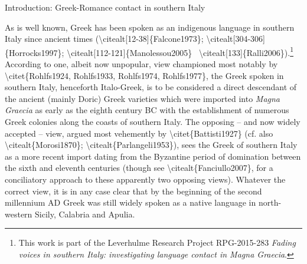 \documentclass[output=paper,modfonts,nonflat]{langsci/langscibook}
\begin{document}
\setcounter{listWWNumxileveli}{0}
\begin{listWWNumxileveli}
\item 
\begin{stylelsSectioni}
Introduction: Greek-Romance contact in southern Italy
\end{stylelsSectioni}
\end{listWWNumxileveli}
\begin{styleStandard}
As is well known, Greek has been spoken as an indigenous language in southern Italy since ancient times ({\textbackslash}citealt[12-38]\{Falcone1973\}; {\textbackslash}citealt[304-306]\{Horrocks1997\}; {\textbackslash}citealt[112-121]\{Manolessou2005\} \ {\textbackslash}citealt[133]\{Ralli2006\}).\footnote{ This work is part of the Leverhulme Research Project RPG-2015-283 \textit{Fading voices in southern Italy: investigating language contact in Magna Graecia}.} According to one, albeit now unpopular, view championed most notably by {\textbackslash}citet\{Rohlfs1924, Rohlfs1933, Rohlfs1974, Rohlfs1977\}, the Greek spoken in southern Italy, henceforth Italo-Greek, is to be considered a direct descendant of the ancient (mainly Doric) Greek varieties which were imported into \textit{Magna Graecia }as early as the eighth century BC with the establishment of numerous Greek colonies along the coasts of southern Italy. The opposing – and now widely accepted – view, argued most vehemently by {\textbackslash}citet\{Battisti1927\} (cf. also {\textbackslash}citealt\{Morosi1870\}; {\textbackslash}citealt\{Parlangeli1953\}), sees the Greek of southern Italy as a more recent import dating from the Byzantine period of domination between the sixth and eleventh centuries (though see {\textbackslash}citealt\{Fanciullo2007\}, for a conciliatory approach to these apparently two opposing views). Whatever the correct view, it is in any case clear that by the beginning of the second millennium AD Greek was still widely spoken as a native language in north-western Sicily, Calabria and Apulia.
\end{styleStandard}
\end{document}
